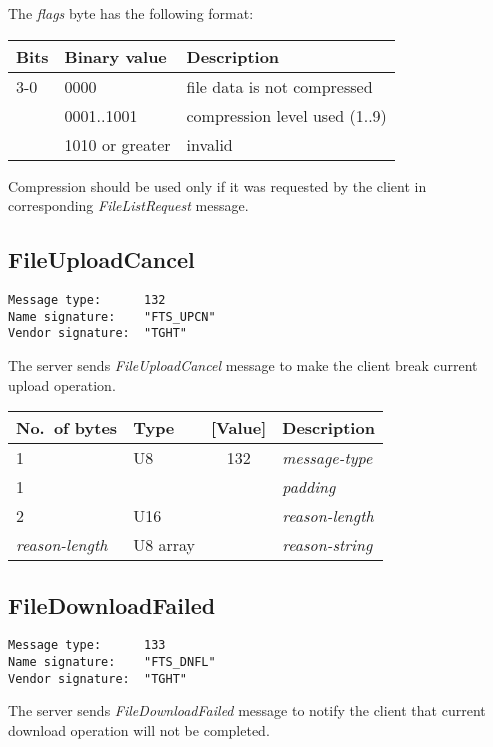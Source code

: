 \documentclass[a4paper]{article}
\newcommand{\typestr}[1]{\textit{#1}}
\begin{document}
The \typestr{flags} byte has the following format:

\begin{tabular}{l|l|l}
\hline
Bits & Binary value   & Description \\ \hline
3-0 & 0000            & file data is not compressed \\
    & 0001..1001      & compression level used (1..9) \\
    & 1010 or greater & invalid \\
\hline
\end{tabular}

Compression should be used only if it was requested by the client in
corresponding \typestr{FileListRequest} message.


\newpage
\subsection{FileUploadCancel}
\begin{verbatim}
Message type:      132
Name signature:    "FTS_UPCN"
Vendor signature:  "TGHT"
\end{verbatim}

The server sends \typestr{FileUploadCancel} message to make the client
break current upload operation.

\begin{tabular}{l|lc|l} \hline
No.\ of bytes & Type & [Value] & Description \\ \hline
1 & U8  & 132 & \typestr{message-type} \\
1 &     &     & \typestr{padding} \\
2 & U16 &     & \typestr{reason-length} \\
\typestr{reason-length} & U8 array & & \typestr{reason-string} \\
\hline\end{tabular}


\newpage
\subsection{FileDownloadFailed}
\begin{verbatim}
Message type:      133
Name signature:    "FTS_DNFL"
Vendor signature:  "TGHT"
\end{verbatim}

The server sends \typestr{FileDownloadFailed} message to notify the
client that current download operation will not be completed.
\end{document}
